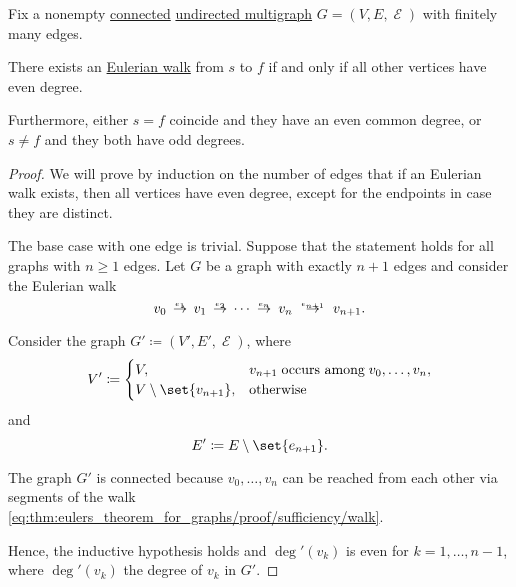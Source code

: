 \begin{theorem}\label{thm:eulers_theorem_for_graphs}
  Fix a nonempty \hyperref[def:graph_connectedness/undirected]{connected} \hyperref[def:hypergraph/multigraph]{undirected multigraph} \( G = (V, E, \mscrE) \) with finitely many edges.

  There exists an \hyperref[def:eulerian_walk]{Eulerian walk} from \( s \) to \( f \) if and only if all other vertices have even degree.

  Furthermore, either \( s = f \) coincide and they have an even common degree, or \( s \neq f \) and they both have odd degrees.
\end{theorem}
\begin{proof}
  \SufficiencySubProof We will prove by induction on the number of edges that if an Eulerian walk exists, then all vertices have even degree, except for the endpoints in case they are distinct.

  The base case with one edge is trivial. Suppose that the statement holds for all graphs with \( n \geq 1 \) edges. Let \( G \) be a graph with exactly \( n + 1 \) edges and consider the Eulerian walk
  \begin{equation}\label{eq:thm:eulers_theorem_for_graphs/proof/sufficiency/walk}
    v_0 \reloset {e_1} \to v_1 \reloset {e_2} \to \cdots \reloset {e_n} \to v_n \reloset {e_{n+1}} \to v_{n+1}.
  \end{equation}

  Consider the graph \( G' \coloneqq (V', E', \mscrE) \), where
  \begin{equation*}
    V' \coloneqq \begin{cases}
      V,                           &v_{n+1} \T{occurs among} v_0, \ldots, v_n, \\
      V \setminus \set{ v_{n+1} }, &\T{otherwise}
    \end{cases}
  \end{equation*}
  and
  \begin{equation*}
    E' \coloneqq E \setminus \set{ e_{n+1} }.
  \end{equation*}

  The graph \( G' \) is connected because \( v_0, \ldots, v_n \) can be reached from each other via segments of the walk \eqref{eq:thm:eulers_theorem_for_graphs/proof/sufficiency/walk}.

  Hence, the inductive hypothesis holds and \( \deg'(v_k) \) is even for \( k = 1, \ldots, n - 1 \), where \( \deg'(v_k) \) the degree of \( v_k \) in \( G' \).


\end{proof}
